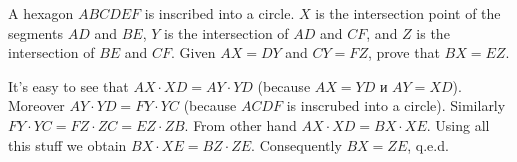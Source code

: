\problem
A hexagon $ABCDEF$ is inscribed into a circle.
$X$ is the intersection point of the segments $AD$ and $BE$,
$Y$ is the intersection of $AD$ and $CF$,
and $Z$ is the intersection of $BE$ and $CF$.
Given $AX = DY$ and $CY = FZ$, prove that $BX = EZ$.

\solution
It's easy to see that $AX \cdot XD = AY \cdot YD$ (because $AX=YD$ и $AY=XD$).
Moreover $AY \cdot YD = FY \cdot YC$ (because $ACDF$ is inscrubed into a circle).
Similarly $FY \cdot YC = FZ \cdot ZC = EZ \cdot ZB$. From other hand $AX \cdot XD = BX \cdot XE$. Using all this stuff we obtain $BX \cdot XE = BZ \cdot ZE$.
Consequently $BX = ZE$, q.e.d.
\endproblem
